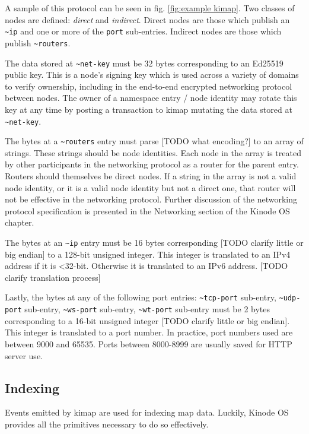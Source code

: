 \documentclass[runningheads]{llncs}
\begin{document}
A sample of this protocol can be seen in fig. \ref{fig:example kimap}. Two classes of nodes are defined: \textit{direct} and \textit{indirect}. Direct nodes are those which publish an \verb|~ip| and one or more of the \verb|port| sub-entries. Indirect nodes are those which publish \verb|~routers|.

The data stored at \verb|~net-key| must be 32 bytes corresponding to an Ed25519 public key.
This is a node's signing key which is used across a variety of domains to verify ownership, including in the end-to-end encrypted networking protocol between nodes.
The owner of a namespace entry / node identity may rotate this key at any time by posting a transaction to kimap mutating the data stored at \verb|~net-key|.

The bytes at a \verb|~routers| entry must parse [TODO what encoding?] to an array of strings.
These strings should be node identities.
Each node in the array is treated by other participants in the networking protocol as a router for the parent entry.
Routers should themselves be direct nodes.
If a string in the array is not a valid node identity, or it is a valid node identity but not a direct one, that router will not be effective in the networking protocol.
Further discussion of the networking protocol specification is presented in the Networking section of the Kinode OS chapter.

The bytes at an \verb|~ip| entry must be 16 bytes corresponding [TODO clarify little or big endian] to a 128-bit unsigned integer.
This integer is translated to an IPv4 address if it is <32-bit.
Otherwise it is translated to an IPv6 address. [TODO clarify translation process]

Lastly, the bytes at any of the following port entries: \verb|~tcp-port| sub-entry, \verb|~udp-port| sub-entry, \verb|~ws-port| sub-entry, \verb|~wt-port| sub-entry must be 2 bytes corresponding to a 16-bit unsigned integer [TODO clarify little or big endian].
This integer is translated to a port number.
In practice, port numbers used are between 9000 and 65535.
Ports between 8000-8999 are usually saved for HTTP server use.

\subsection{Indexing}

Events emitted by kimap are used for indexing map data.
Luckily, Kinode OS provides all the primitives necessary to do so effectively.
\end{document}
